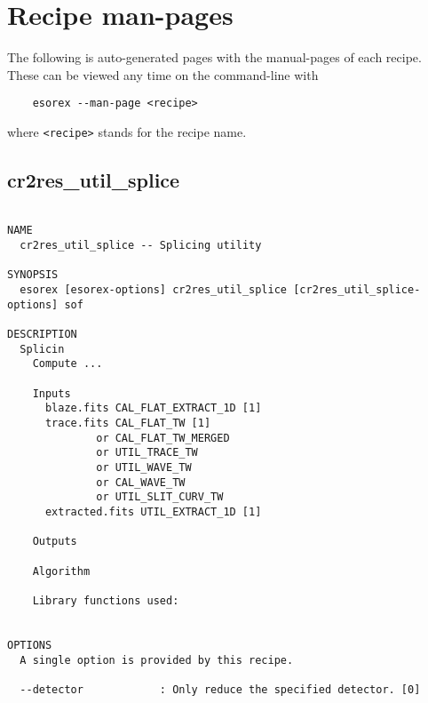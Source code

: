 \section{Recipe man-pages}\label{sec:manpages}
The following is auto-generated pages with the manual-pages
of each recipe. These can be viewed any time on the command-line
with
\begin{verbatim}
    esorex --man-page <recipe>
\end{verbatim}
where \texttt{<recipe>} stands for the recipe name.

\subsection{cr2res\_util\_splice}
\begin{verbatim}

NAME
  cr2res_util_splice -- Splicing utility

SYNOPSIS
  esorex [esorex-options] cr2res_util_splice [cr2res_util_splice-options] sof

DESCRIPTION
  Splicin                                                                 
    Compute ...                                                           
                                                                          
    Inputs                                                                
      blaze.fits CAL_FLAT_EXTRACT_1D [1]               
      trace.fits CAL_FLAT_TW [1]                       
              or CAL_FLAT_TW_MERGED                    
              or UTIL_TRACE_TW                         
              or UTIL_WAVE_TW                          
              or CAL_WAVE_TW                           
              or UTIL_SLIT_CURV_TW                     
      extracted.fits UTIL_EXTRACT_1D [1]               
                                                                          
    Outputs                                                               
                                                                          
    Algorithm                                                             
                                                                          
    Library functions used:                                               
  

OPTIONS
  A single option is provided by this recipe.

  --detector            : Only reduce the specified detector. [0]

\end{verbatim}
